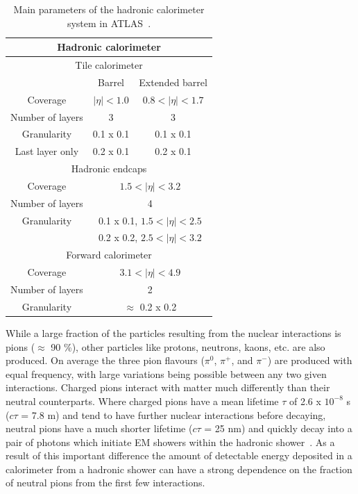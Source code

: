 \begin{table}
  \centering
  \begin{tabular}{ |c|c|c|}
  \hline
  \multicolumn{3}{|c|}{\textbf{Hadronic calorimeter}} \\
  \hline
  \hline
  \multicolumn{3}{|c|}{Tile calorimeter} \\
  \hline 
                     & Barrel                                   & Extended barrel \\
  Coverage           & $\mid\eta\mid<1.0$                       & $0.8<\mid\eta\mid<1.7$ \\
  \hline 
  Number of layers   & 3                                        & 3 \\
  \hline 
  Granularity        & 0.1 x 0.1				& 0.1 x 0.1 \\
  Last layer only    & 0.2 x 0.1				& 0.2 x 0.1 \\
  \hline 
  \hline
  \multicolumn{3}{|c|}{Hadronic endcaps} \\
  \hline 
  Coverage           & 	\multicolumn{2}{|c|}{$1.5<\mid\eta\mid<3.2$} \\
  \hline
  Number of layers   &  \multicolumn{2}{|c|}{ 4} \\
  \hline
  Granularity        & 	\multicolumn{2}{|c|}{0.1 x 0.1, $1.5<\mid\eta\mid<2.5$} \\
  		     &  \multicolumn{2}{|c|}{ 0.2 x 0.2, $2.5<\mid\eta\mid<3.2$} \\
  \hline
  \hline
  \multicolumn{3}{|c|}{Forward calorimeter} \\
  \hline
  Coverage	     & \multicolumn{2}{|c|}{$3.1<\mid\eta\mid<4.9$} \\
  \hline
  Number of layers   & \multicolumn{2}{|c|}{2} \\
  \hline
  Granularity        & \multicolumn{2}{|c|}{$\approx$ 0.2 x 0.2} \\
  \hline
  \end{tabular}
  \caption[Main parameters of the hadronic calorimeter system. ]
        {\small Main parameters of the hadronic calorimeter system in ATLAS~\cite{JOIATLAS}. }
\label{table:HadCalo}
\end{table}

While a large fraction of the particles resulting from the nuclear interactions is pions ($\approx$ 90 \%), other particles like protons, neutrons, kaons, etc. are also produced.  
On average the three pion flavours ($\pi^0$, $\pi^{+}$, and $\pi^{-}$) are produced with equal frequency, with large variations being possible between any two given interactions.  
Charged pions interact with matter much differently than their neutral counterparts.  
Where charged pions have a mean lifetime $\tau$ of 2.6 x $10^{-8}$ s ($c\tau$ = 7.8 m) and tend to have further nuclear interactions before decaying, neutral pions have a much shorter lifetime ($c\tau$ = 25 nm) and quickly decay into a pair of photons which initiate EM showers within the hadronic shower~\cite{PDG}.  
As a result of this important difference the amount of detectable energy deposited in a calorimeter from a hadronic shower can have a strong dependence on the fraction of neutral pions from the first few interactions.  

